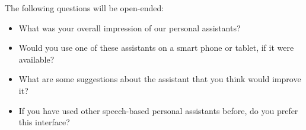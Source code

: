 \documentclass[a4paper,10pt]{article}
\begin{document}
The following questions will be open-ended:

\begin{itemize}
 \item What was your overall impression of our personal assistants?
 \item Would you use one of these assistants on a smart phone or tablet, if it were available?
 \item What are some suggestions about the assistant that you think would improve it?
 \item If you have used other speech-based personal assistants before, do you prefer this interface?
\end{itemize}



% 
% 
% 
% 





% 
% 
\end{document}
